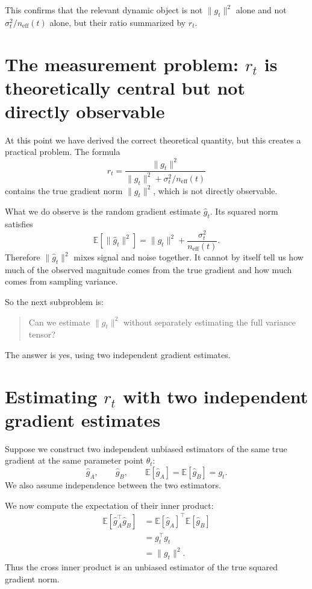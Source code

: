 \documentclass[11pt]{article}
\begin{document}
This confirms that the relevant dynamic object is not $\|g_t\|^2$ alone and not $\sigma_t^2/n_{\mathrm{eff}}(t)$ alone, but their ratio summarized by $r_t$.

\section{The measurement problem: $r_t$ is theoretically central but not directly observable}

At this point we have derived the correct theoretical quantity, but this creates a practical problem. The formula
\[
r_t
=
\frac{\|g_t\|^2}{\|g_t\|^2 + \sigma_t^2/n_{\mathrm{eff}}(t)}
\]
contains the true gradient norm $\|g_t\|^2$, which is not directly observable.

What we do observe is the random gradient estimate $\hat g_t$. Its squared norm satisfies
\[
\mathbb{E}[\|\hat g_t\|^2]
=
\|g_t\|^2 + \frac{\sigma_t^2}{n_{\mathrm{eff}}(t)}.
\]
Therefore $\|\hat g_t\|^2$ mixes signal and noise together. It cannot by itself tell us how much of the observed magnitude comes from the true gradient and how much comes from sampling variance.

So the next subproblem is:
\begin{quote}
Can we estimate $\|g_t\|^2$ without separately estimating the full variance tensor?
\end{quote}

The answer is yes, using two independent gradient estimates.

\section{Estimating $r_t$ with two independent gradient estimates}

Suppose we construct two independent unbiased estimators of the same true gradient at the same parameter point $\theta_t$:
\[
\hat g_A,
\qquad
\hat g_B,
\qquad
\mathbb{E}[\hat g_A]=\mathbb{E}[\hat g_B]=g_t.
\]
We also assume independence between the two estimators.

We now compute the expectation of their inner product:
\begin{align*}
\mathbb{E}[\hat g_A^\top \hat g_B]
&=
\mathbb{E}[\hat g_A]^\top \mathbb{E}[\hat g_B]
\\
&=
g_t^\top g_t
\\
&=
\|g_t\|^2.
\end{align*}
Thus the cross inner product is an unbiased estimator of the true squared gradient norm.
\end{document}
